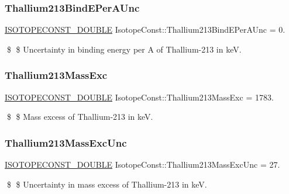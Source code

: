 \subsubsection{\texorpdfstring{Thallium213\+Bind\+E\+Per\+A\+Unc}{Thallium213BindEPerAUnc}}
{\footnotesize\ttfamily \mbox{\hyperlink{group___isotope_const-_macros_ga8f45a7272ce02c0b4c65c44636ed719a}{I\+S\+O\+T\+O\+P\+E\+C\+O\+N\+S\+T\+\_\+\+D\+O\+U\+B\+LE}} Isotope\+Const\+::\+Thallium213\+Bind\+E\+Per\+A\+Unc = 0.}

\$ \$ Uncertainty in binding energy per A of Thallium-\/213 in keV. \mbox{\label{group___isotope_const-_thallium-_tl213_ga4d51c8cd7683d538f7768137c6181e8e}} 
\subsubsection{\texorpdfstring{Thallium213\+Mass\+Exc}{Thallium213MassExc}}
{\footnotesize\ttfamily \mbox{\hyperlink{group___isotope_const-_macros_ga8f45a7272ce02c0b4c65c44636ed719a}{I\+S\+O\+T\+O\+P\+E\+C\+O\+N\+S\+T\+\_\+\+D\+O\+U\+B\+LE}} Isotope\+Const\+::\+Thallium213\+Mass\+Exc = 1783.}

\$ \$ Mass excess of Thallium-\/213 in keV. \mbox{\label{group___isotope_const-_thallium-_tl213_ga639716c12b7d05b06cf28e76a7e08728}} 
\subsubsection{\texorpdfstring{Thallium213\+Mass\+Exc\+Unc}{Thallium213MassExcUnc}}
{\footnotesize\ttfamily \mbox{\hyperlink{group___isotope_const-_macros_ga8f45a7272ce02c0b4c65c44636ed719a}{I\+S\+O\+T\+O\+P\+E\+C\+O\+N\+S\+T\+\_\+\+D\+O\+U\+B\+LE}} Isotope\+Const\+::\+Thallium213\+Mass\+Exc\+Unc = 27.}

\$ \$ Uncertainty in mass excess of Thallium-\/213 in keV. \mbox{\label{group___isotope_const-_thallium-_tl213_gacc670aacfc222b9ea4a5a3683cad66f3}} 
